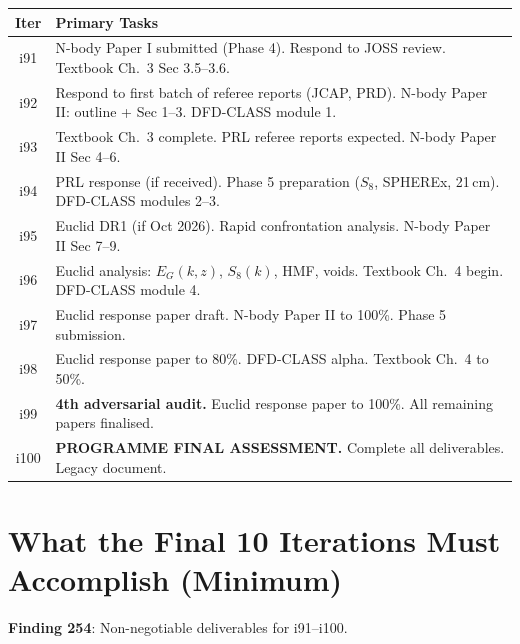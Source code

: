 \documentclass[11pt,a4paper]{article}
\begin{document}
\begin{center}
\begin{longtable}{cl}
\toprule
\textbf{Iter} & \textbf{Primary Tasks} \\
\midrule
\endhead
i91 & N-body Paper I submitted (Phase 4). Respond to JOSS review. Textbook Ch.\ 3 Sec 3.5--3.6. \\
i92 & Respond to first batch of referee reports (JCAP, PRD). N-body Paper II: outline + Sec 1--3. DFD-CLASS module 1. \\
i93 & Textbook Ch.\ 3 complete. PRL referee reports expected. N-body Paper II Sec 4--6. \\
i94 & PRL response (if received). Phase 5 preparation ($S_8$, SPHEREx, 21\,cm). DFD-CLASS modules 2--3. \\
i95 & Euclid DR1 (if Oct 2026). Rapid confrontation analysis. N-body Paper II Sec 7--9. \\
i96 & Euclid analysis: $E_G(k,z)$, $S_8(k)$, HMF, voids. Textbook Ch.\ 4 begin. DFD-CLASS module 4. \\
i97 & Euclid response paper draft. N-body Paper II to 100\%. Phase 5 submission. \\
i98 & Euclid response paper to 80\%. DFD-CLASS alpha. Textbook Ch.\ 4 to 50\%. \\
i99 & \textbf{4th adversarial audit.} Euclid response paper to 100\%. All remaining papers finalised. \\
i100 & \textbf{PROGRAMME FINAL ASSESSMENT.} Complete all deliverables. Legacy document. \\
\bottomrule
\end{longtable}
\end{center}

\section{What the Final 10 Iterations Must Accomplish (Minimum)}

\textbf{Finding 254}: Non-negotiable deliverables for i91--i100.
\end{document}
